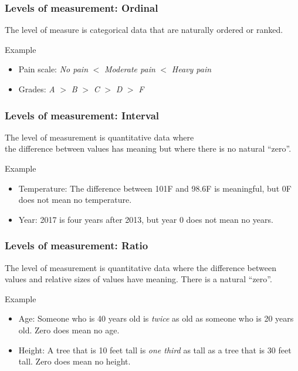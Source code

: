 \documentclass[xcolor=table, aspectratio=169, bigger]{beamer}
\begin{document}
\begin{frame}
\frametitle{Levels of measurement: Ordinal}
\begin{block}{}
The  level of measure is categorical data that are naturally ordered or ranked.
\end{block}
\pause
\begin{exampleblock}{Example}
\begin{itemize}
\item Pain scale: \emph{No pain} $<$ \emph{Moderate pain} $<$ \emph{Heavy pain}
\item Grades: \emph A $>$ \emph B $>$ \emph C $>$ \emph D $>$ \emph F
\end{itemize}
\end{exampleblock}
\end{frame}

\begin{frame}
\frametitle{Levels of measurement: Interval}
\begin{block}{}
The  level of measurement is quantitative data where\\ the difference between values has meaning but where there is no natural ``zero''.
\end{block}
\pause
\begin{exampleblock}{Example}
\begin{itemize}
\item Temperature: The difference between 101\textdegree F and 98.6\textdegree F is meaningful, but 0\textdegree F does not mean no temperature.
\item Year: 2017 is four years after 2013, but year 0 does not mean no years.
\end{itemize}
\end{exampleblock}
\end{frame}

\begin{frame}
\frametitle{Levels of measurement: Ratio}
\begin{block}{}
The  level of measurement is quantitative data where the difference between values and relative sizes of values have meaning. There is a natural ``zero''.
\end{block}
\pause
\begin{exampleblock}{Example}
\begin{itemize}
\item Age: Someone who is 40 years old is \emph{twice} as old as someone who is 20 years old. Zero does mean no age.

\item Height: A tree that is 10 feet tall is \emph{one third} as tall as a tree that is 30 feet tall. Zero does mean no height.
\end{itemize}

\end{exampleblock}
\end{frame}
\end{document}
